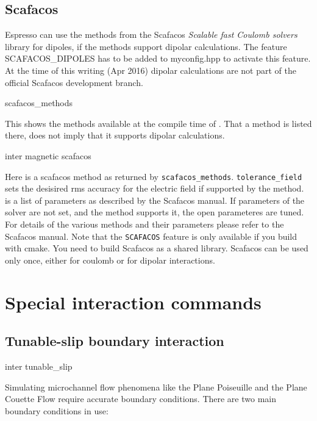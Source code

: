 \subsection{Scafacos}
Espresso can use the methods from the Scafacos \emph{Scalable fast Coulomb solvers} library for dipoles, if the methods support dipolar calculations.
The feature SCAFACOS\_DIPOLES has to be added to myconfig.hpp to activate this feature.
At the time of this writing (Apr 2016) dipolar calculations are not part of the official Scafacos development branch.
\begin{essyntax}
  scafacos_methods
  \begin{features}
  \end{features}
\end{essyntax}
This shows the methods available at the compile time of \es{}.
That a method is listed there, does not imply that it supports dipolar calculations.
\begin{essyntax}
  inter magnetic  scafacos   
  \begin{features}
  \end{features}
\end{essyntax}
Here  is a scafacos method as returned by \texttt{scafacos_methods}. 
\texttt{tolerance_field} sets the desisired rms accuracy for the electric field if supported by the method.
 is a list of parameters as described by the Scafacos manual. If parameters of the solver
are not set, and the method supports it, the open parameteres are tuned.
For details of the various methods and their parameters please refer to the Scafacos manual.
Note that the \texttt{SCAFACOS} feature is only available if you build with cmake. You need
to build Scafacos as a shared library.
Scafacos can be used only once, either for coulomb or for dipolar interactions.


\section{Special interaction commands}
\label{sec:inter-other}

\subsection{Tunable-slip boundary interaction}\label{sec:tunableSlip}
\begin{essyntax}
  inter  
  tunable_slip    
    
  \begin{features}
  \end{features}
\end{essyntax}
Simulating microchannel flow phenomena like the Plane Poiseuille and
the Plane Couette Flow require accurate boundary conditions. There are
two main boundary conditions in use:

